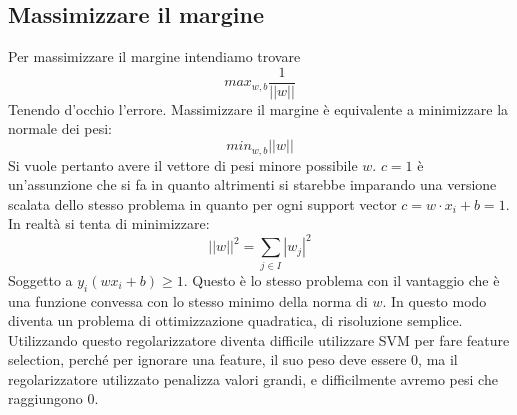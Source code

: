 	\subsection{Massimizzare il margine}
	Per massimizzare il margine intendiamo trovare
	$$max_{w,b}\dfrac{1}{||w||}$$
	Tenendo d'occhio l'errore.
	Massimizzare il margine \`e equivalente a minimizzare la normale dei pesi:
	$$min_{w,b}||w||$$
	Si vuole pertanto avere il vettore di pesi minore possibile $w$.
	$c=1$ \`e un'assunzione che si fa in quanto altrimenti si starebbe imparando una versione scalata dello stesso problema in quanto per ogni support vector $c = w\cdot x_i +b = 1$.
	In realt\`a si tenta di minimizzare:
	$$||w||^2 = \sum\limits_{j\in I}|w_j|^2$$
	Soggetto a $y_i(wx_i+b) \ge 1$.
	Questo \`e lo stesso problema con il vantaggio che \`e una funzione convessa con lo stesso minimo della norma di $w$.
	In questo modo diventa un problema di ottimizzazione quadratica, di risoluzione semplice.
	Utilizzando questo regolarizzatore diventa difficile utilizzare SVM per fare feature selection, perché per ignorare una feature, il suo peso deve essere 0, ma il regolarizzatore utilizzato penalizza valori grandi, e difficilmente avremo pesi che raggiungono 0.


